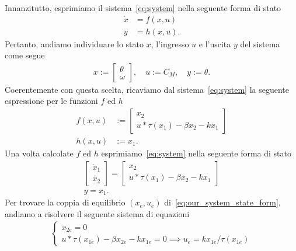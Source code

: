 \documentclass[a4paper, 11pt]{article}
\begin{document}
Innanzitutto, esprimiamo il sistema~\eqref{eq:system} nella seguente forma di stato
%
\begin{subequations}
\begin{align}\label{eq:state_form}
	\dot{x} &= f(x,u)
	\\
	y &= h(x,u).
\end{align}
\end{subequations}
%
Pertanto, andiamo individuare lo stato $x$, l'ingresso $u$ e l'uscita $y$ del sistema come segue 
%
\begin{align*}
	x := \begin{bmatrix}
		\theta \\
		\omega
	\end{bmatrix}, \quad u := C_M, \quad y := \theta.
\end{align*}
%
Coerentemente con questa scelta, ricaviamo dal sistema~\eqref{eq:system} la seguente espressione per le funzioni $f$ ed $h$
%
\begin{align*}
	f(x,u) &:= \begin{bmatrix}
		x_2 \\
		u*\tau(x_1)-\beta x_2 - k x_1
	\end{bmatrix}
	\\
	h(x,u) &:= x_1.
\end{align*}
%
Una volta calcolate $f$ ed $h$ esprimiamo~\eqref{eq:system} nella seguente forma di stato
%
\begin{subequations}\label{eq:our_system_state_form}
\begin{gather*}
	\begin{bmatrix}
		\dot{x}_1
		\\
		\dot{x_2}
	\end{bmatrix} = \begin{bmatrix}
	x_2 \\
	u*\tau(x_1)-\beta x_2 - k x_1
	\end{bmatrix} \label{eq:state_form_1}
	\\ 
	y = x_1.
\end{gather*}
\end{subequations}
%
Per trovare la coppia di equilibrio $(x_e, u_e)$ di~\eqref{eq:our_system_state_form}, andiamo a risolvere il seguente sistema di equazioni
%
\begin{align}
	\begin{cases}
		x_{2e} = 0 \\
		u*\tau(x_{1e})-\beta x_{2e} - k x_{1e}= 0 \implies u_e = k x_{1e}/\tau(x_{1e})
	\end{cases}
\end{align}
\end{document}
